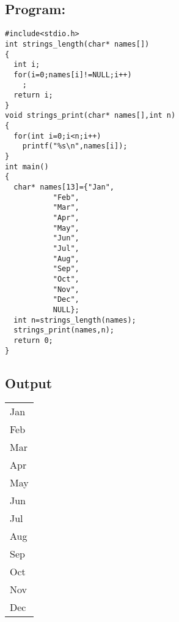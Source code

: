 \documentclass[11pt]{article}
\begin{document}
\subsection*{Program:}
\label{sec-2-2}
\begin{verbatim}
#include<stdio.h>
int strings_length(char* names[])
{
  int i;
  for(i=0;names[i]!=NULL;i++)
    ;
  return i;
}
void strings_print(char* names[],int n)
{
  for(int i=0;i<n;i++)
    printf("%s\n",names[i]);
}
int main()
{
  char* names[13]={"Jan",
		   "Feb",
		   "Mar",
		   "Apr",
		   "May",
		   "Jun",
		   "Jul",
		   "Aug",
		   "Sep",
		   "Oct",
		   "Nov",
		   "Dec",
		   NULL};
  int n=strings_length(names);
  strings_print(names,n);
  return 0;
}
\end{verbatim}
\subsection*{Output}
\label{sec-2-3}
\begin{center}
\begin{tabular}{l}
Jan\\
Feb\\
Mar\\
Apr\\
May\\
Jun\\
Jul\\
Aug\\
Sep\\
Oct\\
Nov\\
Dec\\
\end{tabular}
\end{center}
\end{document}
